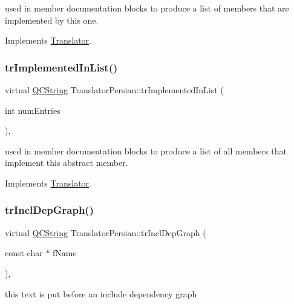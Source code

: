 used in member documentation blocks to produce a list of members that are implemented by this one. 

Implements \mbox{\hyperlink{class_translator}{Translator}}.

\mbox{\label{class_translator_persian_aad9ca32f47f8d0f5f4c8457c1a4a3931}} 
\subsubsection{\texorpdfstring{trImplementedInList()}{trImplementedInList()}}
{\footnotesize\ttfamily virtual \mbox{\hyperlink{class_q_c_string}{Q\+C\+String}} Translator\+Persian\+::tr\+Implemented\+In\+List (\begin{DoxyParamCaption}\item[{int}]{num\+Entries }\end{DoxyParamCaption})\hspace{0.3cm}{\ttfamily [inline]}, {\ttfamily [virtual]}}

used in member documentation blocks to produce a list of all members that implement this abstract member. 

Implements \mbox{\hyperlink{class_translator}{Translator}}.

\mbox{\label{class_translator_persian_a204a1b4bb89a3a920594d0499f2a8973}} 
\subsubsection{\texorpdfstring{trInclDepGraph()}{trInclDepGraph()}}
{\footnotesize\ttfamily virtual \mbox{\hyperlink{class_q_c_string}{Q\+C\+String}} Translator\+Persian\+::tr\+Incl\+Dep\+Graph (\begin{DoxyParamCaption}\item[{const char $\ast$}]{f\+Name }\end{DoxyParamCaption})\hspace{0.3cm}{\ttfamily [inline]}, {\ttfamily [virtual]}}

this text is put before an include dependency graph 

